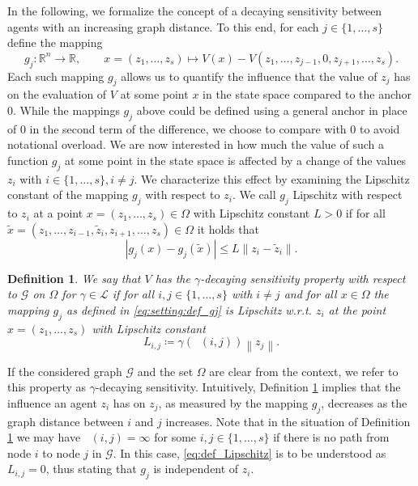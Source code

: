 \documentclass{article}
\newcommand{\R}{\mathbb{R}}
\newcommand{\Rn}{\R^n}
\newcommand{\G}{\mathcal{G}}
\renewcommand{\L}{\mathcal{L}}
\DeclareMathOperator{\distG}{\operatorname{dist_\mathcal{G}}} %
\newcommand{\agents}{\lbrace 1, \dots, s \rbrace}
\newcommand{\norm}[1]{\left\lVert {#1} \right\rVert}
\newtheorem{definition}{Definition}[section]
\begin{document}
In the following, we formalize the concept of a decaying sensitivity between agents with an increasing graph distance. To this end, for each $j \in \agents$ define the mapping 
    \begin{equation} \label{eq:setting:def_gj}
        g_j \colon \Rn \to \R , \qquad 
        x = (z_1, \dots, z_s) \mapsto V(x) - V(z_1, \dots, z_{j-1}, 0, z_{j+1}, \dots, z_s).
    \end{equation}
Each such mapping $g_j$ allows us to quantify the influence that the value of $z_j$ has on the evaluation of $V$ at some point $x$ in the state space compared to the anchor $0$. While the mappings $g_j$ above could be defined using a general anchor in place of $0$ in the second term of the difference, we choose to compare with $0$ to avoid notational overload. We are now interested in how much the value of such a function $g_j$ at some point in the state space is affected by a change of the values $z_i$ with $i \in \agents, i \neq j$. We characterize this effect by examining the Lipschitz constant of the mapping $g_j$ with respect to $z_i$. We call $g_j$ Lipschitz with respect to $z_i$ at a point $x = (z_1, \dots, z_s) \in \Omega$ with Lipschitz constant $L > 0$ if for all $\tilde{x} = (z_1, \dots, z_{i-1}, \tilde{z}_i, z_{i+1}, \dots, z_s) \in \Omega$ it holds that 
\begin{equation*}
    |g_j(x) - g_j(\tilde{x})| \leq L \| z_i - \tilde{z}_i \|. 
\end{equation*}
\begin{definition} \label{def:setting:sensitivity}
   We say that $V$ has the $\gamma$-decaying sensitivity property with respect to $\G$ on $\Omega$ for $\gamma \in \L$ if for all $i, j \in \agents$ with $i \neq j$ and for all $x \in \Omega$ the mapping $g_j$ as defined in \eqref{eq:setting:def_gj} is Lipschitz w.r.t. $z_i$ at the point $x = (z_1, \dots, z_s)$ with Lipschitz constant
    \begin{equation} \label{eq:def_Lipschitz}
        L_{i,j} \coloneqq \gamma (\distG(i,j)) \norm{z_j}. 
    \end{equation}
\end{definition}
If the considered graph $\mathcal{G}$ and the set $\Omega$ are clear from the context, we refer to this property as $\gamma$-decaying sensitivity. Intuitively, Definition \ref{def:setting:sensitivity} implies that the influence an agent $z_i$ has on $z_j$, as measured by the mapping $g_j$, decreases as the graph distance between $i$ and $j$ increases. Note that in the situation of Definition \ref{def:setting:sensitivity} we may have $\distG(i,j) = \infty$ for some $i,j \in \agents$ if there is no path from node $i$ to node $j$ in $\mathcal{G}$. In this case, \eqref{eq:def_Lipschitz} is to be understood as $L_{i,j} = 0$, thus stating that $g_j$ is independent of $z_i$.
\end{document}
